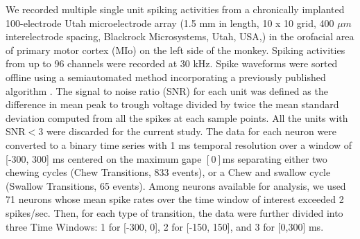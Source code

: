 \documentclass[letterpaper, 9pt, conference]{ieeeconf}
\begin{document}
We recorded multiple single unit spiking activities from a chronically implanted 100-electrode Utah microelectrode array (1.5 mm in length, 10 x 10 grid, 400 $\mu m$ interelectrode spacing, Blackrock Microsystems, Utah, USA,) in the orofacial area of primary motor cortex (MIo) on the left side of the monkey. Spiking activities from up to 96 channels were recorded at 30 kHz. Spike waveforms were sorted offline using a semiautomated method incorporating a previously published algorithm \cite{ref:VargasIrwin2007}. The signal to noise ratio (SNR) for each unit was defined as the difference in mean peak to trough voltage divided by twice the mean standard deviation computed from all the spikes at each sample points. All the units with SNR$<3$ were discarded for the current study. The data for each neuron were converted to a binary time series with 1 ms temporal resolution over a window of [-300, 300] ms centered on the maximum gape $[0]$ms separating either two chewing cycles (Chew Transitions, 833 events), or a Chew and swallow cycle (Swallow Transitions, 65 events). Among neurons available for analysis, we used 71 neurons whose mean spike rates over the time window of interest exceeded 2 spikes/sec. Then, for each type of transition, the data were further divided into three Time Windows: 1 for [-300, 0], 2 for [-150, 150], and 3 for [0,300] ms.
\end{document}
